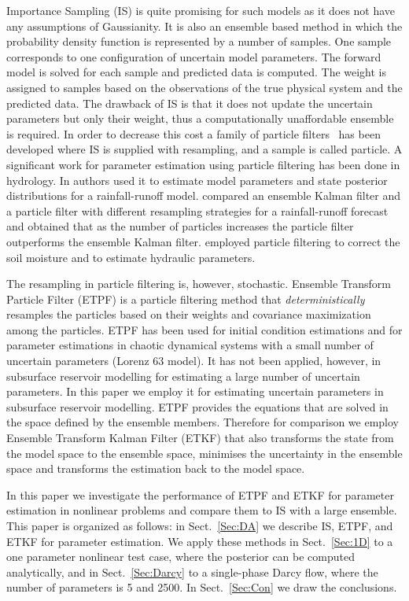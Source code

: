\documentclass[12, a4paper]{article}
\numberwithin{equation}{section}
\begin{document}
Importance Sampling (IS) is quite promising for such models as it does not have any assumptions of Gaussianity. 
It is also an ensemble based method in which the probability density function is represented by a number of samples. 
One sample corresponds to one configuration of uncertain model parameters. 
The forward model is solved for each sample and predicted data is computed. 
The weight is assigned to samples based on the observations of the true physical system and the predicted data. 
The drawback of IS is that it does not update the uncertain parameters but only their weight,
thus a computationally unaffordable ensemble is required. In order to decrease this cost
a family of particle filters~\cite{Doucet01} has been developed where IS is supplied
with resampling, and a sample is called particle. 
A significant work for parameter estimation using particle filtering has been done in hydrology. In \cite{Moetal05} authors used it to estimate model parameters and state posterior distributions for a rainfall-runoff model. \cite{WeEl06} compared an ensemble Kalman filter and a particle filter with different resampling strategies for a rainfall-runoff forecast and obtained that as the number of particles increases the particle filter outperforms the ensemble Kalman filter. \cite{Guietal12} employed particle filtering to correct the soil moisture and to estimate hydraulic parameters. 

The resampling in particle filtering is, however, stochastic. Ensemble Transform Particle Filter (ETPF) \cite{ReCo15} 
is a particle filtering method that {\it deterministically} resamples the particles based on their weights and covariance maximization among the particles. ETPF has been used for initial condition estimations and for parameter estimations in chaotic dynamical systems with a small number of uncertain parameters (Lorenz 63 model). It has not been applied, however, in subsurface reservoir modelling for estimating a large number of uncertain parameters. In this paper we employ it for estimating uncertain parameters in subsurface reservoir modelling. ETPF provides the equations that are solved in the space defined by the ensemble members. Therefore for comparison we employ Ensemble Transform Kalman Filter (ETKF) \cite{Bietal01} that also transforms the state from the model space to the ensemble space, minimises the uncertainty in the ensemble space and transforms the estimation back to the model space.  

In this paper we investigate the performance of ETPF and ETKF for parameter estimation in nonlinear problems and compare them to IS with a large ensemble. This paper is organized as follows: in Sect.~\ref{Sec:DA} we describe IS, ETPF, and ETKF for parameter estimation. We apply these methods in Sect.~\ref{Sec:1D} to a one parameter nonlinear test case, where the posterior can be computed analytically, and in Sect.~\ref{Sec:Darcy} to a single-phase Darcy flow, where the number of parameters is 5 and 2500. In Sect.~\ref{Sec:Con} we draw the conclusions.
\end{document}
